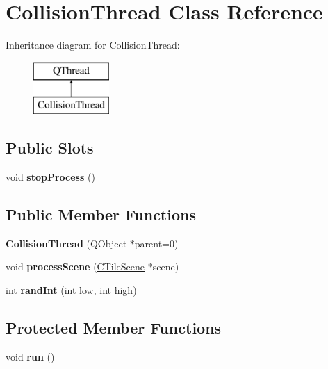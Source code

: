 \hypertarget{class_collision_thread}{}\section{Collision\+Thread Class Reference}
\label{class_collision_thread}
Inheritance diagram for Collision\+Thread\+:\begin{figure}[H]
\begin{center}
\leavevmode
\includegraphics[height=2.000000cm]{class_collision_thread}
\end{center}
\end{figure}
\subsection*{Public Slots}
\begin{DoxyCompactItemize}
\item 
\mbox{\label{class_collision_thread_a4ae79d681fed265756d2c48efd213026}} 
void {\bfseries stop\+Process} ()
\end{DoxyCompactItemize}
\subsection*{Public Member Functions}
\begin{DoxyCompactItemize}
\item 
\mbox{\label{class_collision_thread_a3cb7a49e90c05d31066133a6032a3a36}} 
{\bfseries Collision\+Thread} (Q\+Object $\ast$parent=0)
\item 
\mbox{\label{class_collision_thread_a0d75fdfd59426918d2f33620bd9576c2}} 
void {\bfseries process\+Scene} (\hyperlink{class_c_tile_scene}{C\+Tile\+Scene} $\ast$scene)
\item 
\mbox{\label{class_collision_thread_a62880a04125cf4bece583430089e1433}} 
int {\bfseries rand\+Int} (int low, int high)
\end{DoxyCompactItemize}
\subsection*{Protected Member Functions}
\begin{DoxyCompactItemize}
\item 
\mbox{\label{class_collision_thread_a52aa20a085b0e6386ebaaa981212f5b1}} 
void {\bfseries run} ()
\end{DoxyCompactItemize}
